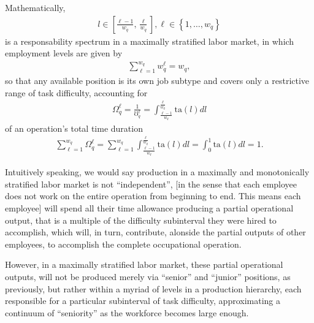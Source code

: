 \documentclass[hidelinks, nonatbib]{elsarticle}
\begin{document}
        Mathematically,
        \begin{gather}
            l \in \left[
            \frac{\ell - 1}{w_q}
            ,
            \frac{\ell}{w_q}
            \right]
            ,
            \ell \in 
            \left\{
                1, \dots, w_q
            \right\}
        \end{gather}
        is a responsability spectrum in a maximally stratified labor market, in which employment levels are given by
        \begin{gather}
            \sum_{\ell=1}^{w_q}
            w_{q}^{\ell}
            =
            w_q
            ,
        \end{gather}
        so that any available position is its own job subtype and covers only a restrictive range of task difficulty, accounting for
        \begin{gather}
            \Omega_{q}^{\ell} = 
            \frac{1}{\mho_{q}^{\ell}} = 
            \int_{
                \frac{\ell - 1}{w_q}
            }^{
                \frac{\ell}{w_q}
            }
            \text{ta}(l)dl
        \end{gather}
        of an operation's total time duration
        \begin{gather}
            \sum_{\ell=1}^{w_q}
            \Omega_{q}^{\ell} 
            = 
            \sum_{\ell=1}^{w_q}
            \int_{
                \frac{\ell - 1}{w_q}
            }^{
                \frac{\ell}{w_q}
            }
            \text{ta}(l)dl
            =
            \int_{0}^{1}
            \text{ta}(l)dl
            =
            1
            .
        \end{gather}

        Intuitively speaking, we would say production in a maximally and monotonically stratified labor market is not ``independent'', [in the sense that each employee does not work on the entire operation from beginning to end. This means each employee] will spend all their time allowance producing a partial operational output, that is a multiple of the difficulty subinterval they were hired to accomplish, which will, in turn, contribute, alonside the partial outputs of other employees, to accomplish the complete occupational operation.
        
        However, in a maximally stratified labor market, these partial operational outputs, will not be produced merely via ``senior'' and ``junior'' positions, as previously, but rather within a myriad of levels in a production hierarchy, each responsible for a particular subinterval of task difficulty, approximating a continuum of ``seniority'' as the workforce becomes large enough.
        
\end{document}
